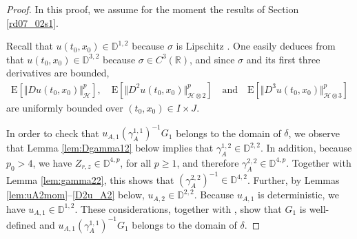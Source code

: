 \documentclass[12pt,a4paper]{article}
\newcommand{\bD}{{\mathbb{D}}}
\newcommand{\R}{{\mathbb{R}}}
\newcommand{\E}{\mathrm{E}}
\newcommand{\HH}{\mathcal{H}}
\newcommand{\<}{\langle}
\renewcommand{\>}{\rangle}
\begin{document}
\begin{proof}
In this proof, we assume for the moment the results of Section \ref{rd07_02s1}.

Recall that $u(t_0, x_0) \in \bD^{1,2}$ because $\sigma$ is Lipschitz \cite[Proposition 2.4.4]{nualart2006}. One easily deduces from \cite[Proposition 4.1]{DKN09} that $u(t_0, x_0) \in \bD^{3,2}$ because $\sigma \in C^3(\R)$, and since $\sigma$ and its first three derivatives are bounded, 
\begin{align}\label{rd08_06e3}
   \E\left[\Vert D u(t_0, x_0) \Vert_\HH^p\right], \quad \E\left[\Vert D^2 u(t_0, x_0) \Vert_{\HH\otimes 2}^p\right] \quad\text{and}\quad \E\left[\Vert D^3 u(t_0, x_0) \Vert_{\HH\otimes 3}^p \right]
\end{align}
are uniformly bounded over $(t_0, x_0) \in I \times J$.

In order to check that $u_{A,1} (\gamma_A^{1,1})^{-1} G_1$ belongs to the domain of $\delta$, we observe that Lemma \ref{lem:Dgamma12} below implies that $\gamma_A^{1, 2} \in \bD^{2, 2}$. In addition, because $p_0 > 4$, we have $Z_{r, z} \in \bD^{4, p}$, for all $p \geq 1$, and therefore $\gamma_A^{2, 2} \in \bD^{4,p}$. Together with Lemma \ref{lem:gamma22}, this shows that $(\gamma_A^{2, 2})^{-1} \in \bD^{4,2}$. Further, by Lemmas \ref{lem:uA2mom}--\ref{D2u_A2} below, $u_{A, 2} \in \bD^{2,2}$. Because $u_{A, 1}$ is deterministic, we have $u_{A, 1} \in \bD^{1, 2}$. These considerations, together with \cite[Propositions 1.3.3 and 1.3.8]{nualart2006}, show that $G_1$ is well-defined and $u_{A,1} (\gamma_A^{1,1})^{-1} G_1$ belongs to the domain of $\delta$.


\end{proof}
\end{document}
